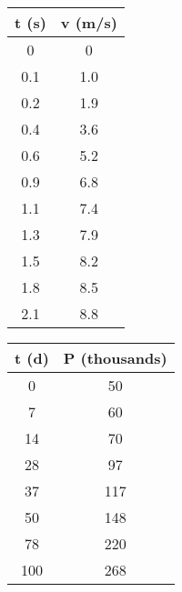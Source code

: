 \documentclass{ximera}
\begin{document}
\begin{minipage}{0.49\textwidth}
\centering
    \begin{tabular}{|c|c|}\hline
         \textbf{t} (s)& \textbf{v} (m/s)  \\ \hline
        0 & 0 \\
    	0.1 &1.0 \\
    	0.2 &  1.9\\
    	0.4 & 3.6 \\
    	0.6 & 5.2 \\
    	0.9 & 6.8 \\
    	1.1 & 7.4 \\
    	1.3 & 7.9 \\
    	1.5 & 8.2 \\
    	1.8 & 8.5\\
    	2.1 & 8.8  \\ \hline
    \end{tabular}
\end{minipage}%
\begin{minipage}{0.49\textwidth}
    \centering
    \begin{tabular}{|c|c|}\hline
         \textbf{t} (d)& \textbf{P} (thousands)  \\ \hline
        0 & 50 \\
       7  & 60 \\
        14 & 70 \\
        28 & 97 \\
        37 & 117 \\
         50 & 148 \\
        78 & 220 \\
        100 & 268
         \\ \hline
    \end{tabular}
\end{minipage}
\end{document}
